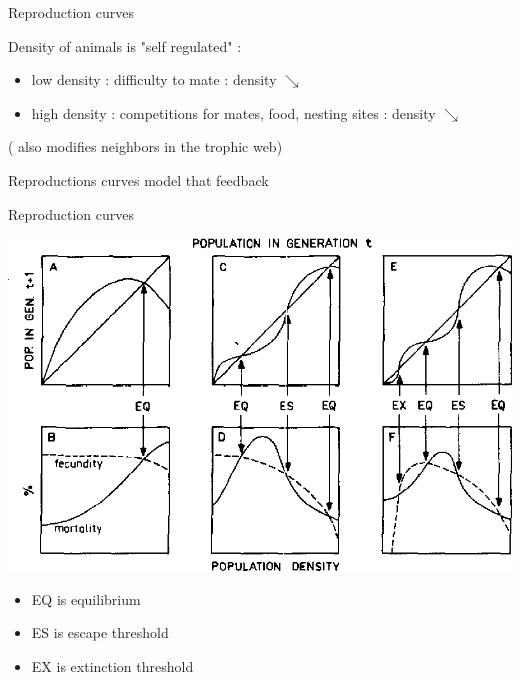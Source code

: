 \documentclass[11,aspectratio=1610]{beamer}
\begin{document}
\begin{frame}{Reproduction curves}
\begin{small}
Density of animals is "self regulated" : 

\begin{itemize}
  \item low density : difficulty to mate : density $\searrow$
  \item high density : competitions for mates, food, nesting sites  :  density $\searrow$
\end{itemize}

( also modifies neighbors in the trophic web)
\end{small}
\vfill 

Reproductions curves model that feedback 


\end{frame}


\begin{frame}{Reproduction curves}


\centering
\includegraphics[height=0.5\textheight]{img/reproduction_curves.png}
\begin{footnotesize}
\begin{itemize}
\item EQ is \alert{equilibrium}
\item ES is \alert{escape threshold}
\item EX is \alert{extinction threshold}
\end{itemize}

  \end{footnotesize}

\end{frame}
\end{document}
